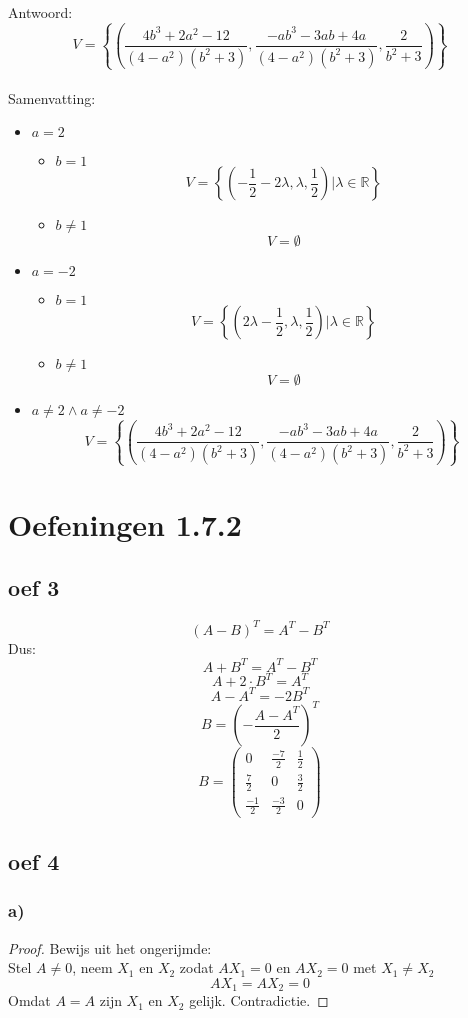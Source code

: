 \documentclass[10pt,a4paper]{article}
\begin{document}
Antwoord:
\[
V = \left\lbrace\left(\frac{4b^{3}+2a^{2}-12}{(4-a^{2})(b^{2}+3)},\frac{-ab^{3}-3ab+4a}{(4-a^{2})(b^{2}+3)},\frac{2}{b^{2}+3}\right)\right\rbrace
\]
\\Samenvatting:
\begin{itemize}
\item $a=2$
\begin{itemize}
\item $b=1$
\[
V = \left\lbrace \left(-\frac{1}{2}-2\lambda,\lambda,\frac{1}{2}\right)| \lambda \in \mathbb{R}\right\rbrace
\]
\item $b\neq 1$
\[
V = \emptyset
\]
\end{itemize}
\item $a=-2$
\begin{itemize}
\item $b=1$
\[
V= \left\lbrace \left(2\lambda-\frac{1}{2},\lambda,\frac{1}{2}\right)| \lambda \in \mathbb{R}\right\rbrace
\]
\item $b\neq 1$
\[
V= \emptyset
\]
\end{itemize}
\item $a\neq 2 \wedge a \neq -2$ 
\[
V = \left\lbrace\left(\frac{4b^{3}+2a^{2}-12}{(4-a^{2})(b^{2}+3)},\frac{-ab^{3}-3ab+4a}{(4-a^{2})(b^{2}+3)},\frac{2}{b^{2}+3}\right)\right\rbrace
\]
\end{itemize}
\section{Oefeningen 1.7.2}
\subsection*{oef 3}
$$(A - B)^T = A^T - B^T$$
Dus:
$$A+B^T = A^T - B^T$$
$$A+2\cdot B^T = A^T$$
$$A - A^T = -2B^T$$
$$B = \left(-\frac{A - A^T}{2}\right)^T$$
$$ B = 
\begin{pmatrix}
0 & \frac{-7}{2} & \frac{1}{2}\\
\frac{7}{2} & 0 & \frac{3}{2}\\
\frac{-1}{2} & \frac{-3}{2} & 0
\end{pmatrix}
$$
\subsection*{oef 4}
\subsubsection*{a)}
\begin{proof}
Bewijs uit het ongerijmde:\\
Stel $A\neq 0$, neem $X_1$ en $X_2$ zodat $AX_1 = 0$ en $AX_2=0$ met $X_1\neq X_2$
\[
AX_1 = AX_2 = 0
\]
Omdat $A=A$ zijn $X_1$ en $X_2$ gelijk.
Contradictie.
\end{proof}
\end{document}
